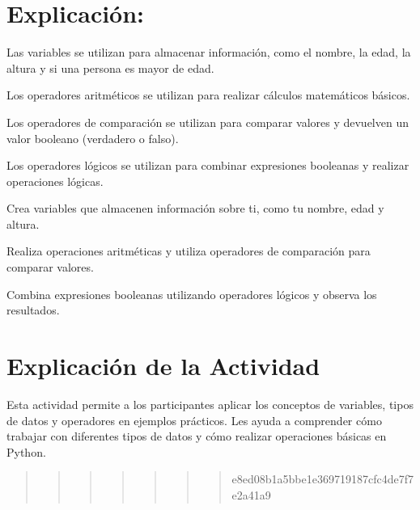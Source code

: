 \documentclass[
  a4paper,
  DIV=11,
  numbers=noendperiod,
  onepage,
  openany]{scrreprt}
\begin{document}
\hypertarget{explicaciuxf3n-5}{%
\section{Explicación:}\label{explicaciuxf3n-5}}

Las variables se utilizan para almacenar información, como el nombre, la
edad, la altura y si una persona es mayor de edad.

Los operadores aritméticos se utilizan para realizar cálculos
matemáticos básicos.

Los operadores de comparación se utilizan para comparar valores y
devuelven un valor booleano (verdadero o falso).

Los operadores lógicos se utilizan para combinar expresiones booleanas y
realizar operaciones lógicas.

\begin{tcolorbox}[enhanced jigsaw, colbacktitle=quarto-callout-important-color!10!white, toprule=.15mm, leftrule=.75mm, titlerule=0mm, opacityback=0, rightrule=.15mm, opacitybacktitle=0.6, breakable, left=2mm, coltitle=black, title=\textcolor{quarto-callout-important-color}{\faExclamation}\hspace{0.5em}{Actividad Práctica:}, toptitle=1mm, bottomtitle=1mm, arc=.35mm, bottomrule=.15mm, colback=white, colframe=quarto-callout-important-color-frame]

Crea variables que almacenen información sobre ti, como tu nombre, edad
y altura.

Realiza operaciones aritméticas y utiliza operadores de comparación para
comparar valores.

Combina expresiones booleanas utilizando operadores lógicos y observa
los resultados.

\end{tcolorbox}

\hypertarget{explicaciuxf3n-de-la-actividad-5}{%
\section{Explicación de la
Actividad}\label{explicaciuxf3n-de-la-actividad-5}}

Esta actividad permite a los participantes aplicar los conceptos de
variables, tipos de datos y operadores en ejemplos prácticos. Les ayuda
a comprender cómo trabajar con diferentes tipos de datos y cómo realizar
operaciones básicas en Python.

\begin{quote}
\begin{quote}
\begin{quote}
\begin{quote}
\begin{quote}
\begin{quote}
\begin{quote}
e8ed08b1a5bbe1e369719187cfc4de7f7e2a41a9
\end{quote}
\end{quote}
\end{quote}
\end{quote}
\end{quote}
\end{quote}
\end{quote}
\end{document}
